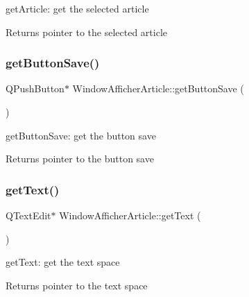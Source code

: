 get\+Article\+: get the selected article 

\begin{DoxyReturn}{Returns}
pointer to the selected article 
\end{DoxyReturn}
\mbox{\label{class_window_afficher_article_a7201792ae876ac84e0a3bf20fd3de313}} 
\subsubsection{\texorpdfstring{get\+Button\+Save()}{getButtonSave()}}
{\footnotesize\ttfamily Q\+Push\+Button$\ast$ Window\+Afficher\+Article\+::get\+Button\+Save (\begin{DoxyParamCaption}{ }\end{DoxyParamCaption})\hspace{0.3cm}{\ttfamily [inline]}}



get\+Button\+Save\+: get the button save 

\begin{DoxyReturn}{Returns}
pointer to the button save 
\end{DoxyReturn}
\mbox{\label{class_window_afficher_article_a955158e6061fffdceed9f97dee9486f1}} 
\subsubsection{\texorpdfstring{get\+Text()}{getText()}}
{\footnotesize\ttfamily Q\+Text\+Edit$\ast$ Window\+Afficher\+Article\+::get\+Text (\begin{DoxyParamCaption}{ }\end{DoxyParamCaption})\hspace{0.3cm}{\ttfamily [inline]}}



get\+Text\+: get the text space 

\begin{DoxyReturn}{Returns}
pointer to the text space 
\end{DoxyReturn}
\mbox{\label{class_window_afficher_article_a2ff36b030fe749ea834d9becb15eedea}} 
